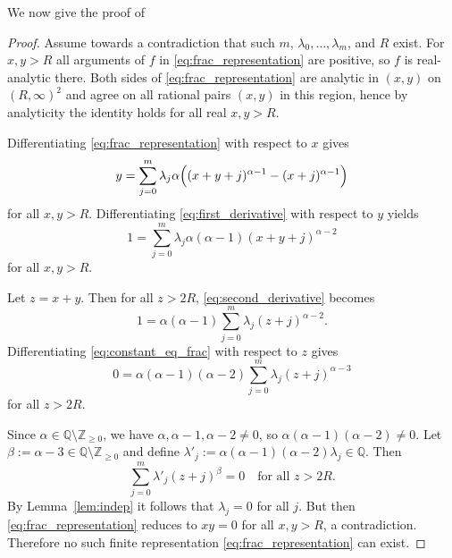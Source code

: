 \documentclass{article}
\theoremstyle{plain}
\theoremstyle{definition}
\theoremstyle{remark}
\begin{document}
We now give the proof of 
\begin{proof}
	
	Assume towards a contradiction that such $m$, $\lambda_0,\dots,\lambda_m$, and
	$R$ exist. For $x,y>R$ all arguments of $f$ in
	\eqref{eq:frac_representation} are positive, so $f$ is real-analytic
	there. Both sides of \eqref{eq:frac_representation} are analytic in
	$(x,y)$ on $(R,\infty)^2$ and agree on all rational pairs $(x,y)$ in this
	region, hence by analyticity the identity holds for all real $x,y>R$.
	
	Differentiating \eqref{eq:frac_representation} with respect to $x$ gives
	\begin{equation}
		\label{eq:first_derivative}
		y
		= \sum_{j=0}^m \lambda_j \alpha\Bigl(
		(x+y+j)^{\alpha-1} - (x+j)^{\alpha-1}
		\Bigr)
	\end{equation}
	for all $x,y>R$. Differentiating \eqref{eq:first_derivative} with respect
	to $y$ yields
	\begin{equation}
		\label{eq:second_derivative}
		1
		= \sum_{j=0}^m \lambda_j \alpha(\alpha-1) (x+y+j)^{\alpha-2}
	\end{equation}
	for all $x,y>R$.
	
	Let $z = x+y$. Then for all $z>2R$, \eqref{eq:second_derivative} becomes
	\begin{equation}
		\label{eq:constant_eq_frac}
		1
		= \alpha(\alpha-1)\sum_{j=0}^m \lambda_j (z+j)^{\alpha-2}.
	\end{equation}
	Differentiating \eqref{eq:constant_eq_frac} with respect to $z$ gives
	\begin{equation}
		\label{eq:zero_eq_frac}
		0
		= \alpha(\alpha-1)(\alpha-2)\sum_{j=0}^m \lambda_j (z+j)^{\alpha-3}
	\end{equation}
	for all $z>2R$.
	
Since $\alpha\in\mathbb{Q}\setminus\mathbb{Z}_{\ge 0}$, we have
$\alpha,\alpha-1,\alpha-2\neq 0$, so $\alpha(\alpha-1)(\alpha-2)\neq 0$.
Let $\beta := \alpha-3 \in \mathbb{Q}\setminus\mathbb{Z}_{\ge 0}$ and define
$\lambda'_j := \alpha(\alpha-1)(\alpha-2)\lambda_j \in \mathbb{Q}$.
Then
\[
\sum_{j=0}^m \lambda'_j (z+j)^\beta = 0
\quad\text{for all } z>2R.
\]
By Lemma~\ref{lem:indep} it follows that  $\lambda_j=0$ for all $j$.
	But then \eqref{eq:frac_representation} reduces to $x y = 0$ for all
	$x,y>R$, a contradiction. Therefore no such finite representation
	\eqref{eq:frac_representation} can exist.
\end{proof}
\end{document}
